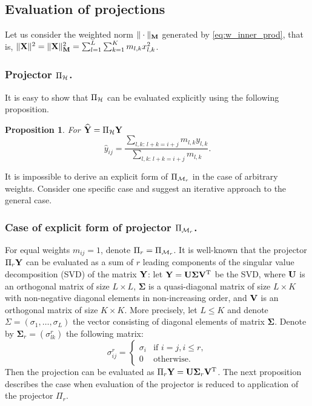 \documentclass[sii]{ipart}
\newtheorem{proposition}{Proposition}
\begin{document}
\subsection{Evaluation of projections}

Let us consider the weighted norm $\|\cdot\|_{\mathbf{M}}$ generated by \eqref{eq:w_inner_prod}, that is, $\|\mathbf{X}\|^2 = \|\mathbf{X}\|^2_{\mathbf{M}} = \sum_{l = 1}^L \sum_{k = 1}^K m_{l, k} x^2_{l, k}$.

\subsubsection{Projector $\Pi_{\mathcal{H}}$.} It is easy to show that $\Pi_{\mathcal{H}}$
can be evaluated explicitly using the following proposition.

\begin{proposition}
	For $\widehat{\mathbf{Y}}=\Pi_{\mathcal{H}} \mathbf{Y}$
	\begin{equation*}
	\hat{y}_{ij} = \frac{\sum_{l,k:\, l+k=i+j} m_{l,k} y_{l,k}}{\sum_{l,k:\, l+k=i+j} m_{l,k}}.
	\end{equation*}
\end{proposition}

It is impossible to derive an explicit form of $\Pi_{\mathcal{M}_r}$ in the case of arbitrary weights.
Consider one specific case and suggest an iterative approach to the general case.

\subsubsection{Case of explicit form of projector $\Pi_{\mathcal{M}_r}$.}
\label{sec:obliqueSVD}
For equal weights $m_{ij}=1$, denote $\Pi_r=\Pi_{\mathcal{M}_r}$.
It is well-known that the projector $\Pi_{r} \mathbf{Y}$ can be evaluated as a sum of $r$ leading components of the singular value decomposition (SVD) of the matrix $\mathbf{Y}$: let $\mathbf{Y} = \mathbf{U} \mathbf{\Sigma} \mathbf{V}^{\mathrm{T}}$ be the SVD, where $\mathbf{U}$ is an orthogonal matrix of size $L \times L$, $\mathbf{\Sigma}$ is a quasi-diagonal matrix of size $L \times K$ with non-negative diagonal elements in non-increasing order, and $\mathbf{V}$ is an orthogonal matrix of size $K \times K$. More precisely, let $L\le K$ and denote $\Sigma = (\sigma_1, \ldots, \sigma_L)$ the vector consisting of diagonal elements of matrix $\mathbf{\Sigma}$. Denote by $\mathbf{\Sigma}_r = (\sigma^r_{l k})$ the following matrix:
\begin{equation*}
\sigma^r_{i j} = \begin{cases}
\sigma_i & \text{if $i = j, i \le r,$}\\
0 & \text{otherwise}.
\end{cases}
\end{equation*}
Then the projection can be evaluated as $\Pi_{r} \mathbf{Y}  = \mathbf{U} \mathbf{\Sigma}_r \mathbf{V}^{\mathrm{T}}$.
The next proposition describes the case when evaluation of the projector is reduced to application of the projector $\Pi_r$.
\end{document}

